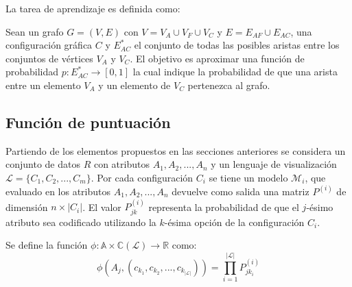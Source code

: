 La tarea de aprendizaje es definida como:


    Sean un grafo $G = (V,E)$ con $V = V_A \cup V_F \cup V_C$ y $E = E_{AF} \cup E_{AC}$,
    una configuraci\'on gr\'afica $C$ y $E_{AC}^*$ el conjunto de todas las posibles aristas entre los conjuntos de v\'ertices $V_A$ y $V_C$.
    El objetivo es aproximar una funci\'on de probabilidad $p : E_{AC}^* \to [0,1]$ la cual indique la probabilidad de que una arista
    entre un elemento $V_A$ y un elemento de $V_C$ pertenezca al grafo.






\subsection{Funci\'on de puntuaci\'on}\label{subsection:score-func}

Partiendo de los elementos propuestos en las secciones anteriores se considera un conjunto
de datos $R$ con atributos $A_1, A_2, ..., A_n$ y un lenguaje de visualizaci\'on $\mathcal{L} = \{C_1,C_2,...,C_m\}$.
Por cada configuraci\'on $C_i$ se tiene un modelo $\mathcal{M}_i$, que evaluado en los atributos $A_1, A_2, ...,A_n$
devuelve como salida una matriz $P^{(i)}$ de dimensi\'on $n\times|C_i|$. El
valor $P^{(i)}_{jk}$ representa la probabilidad de que el $j$-\'esimo atributo sea codificado
utilizando la $k$-\'esima opci\'on de la configuraci\'on $C_i$.

Se define la funci\'on $\phi : \mathbb{A} \times \mathbb{C}(\mathcal{L}) \to \mathbb{R}$
como:
    $$
        \phi(A_j, (c_{k_1},c_{k_2},...,c_{k_{|\mathcal{L}|}} )) = \overset{|\mathcal{L}|}{\underset{i=1}{ \prod }}P^{(i)}_{jk_{i}}
    $$

